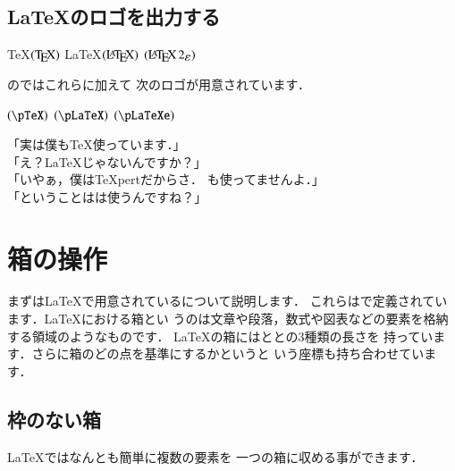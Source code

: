 \subsection{\LaTeX のロゴを出力する}
\begin{usage}
\TeX     $\text{(\TeX)}$
\LaTeX   $\text{(\LaTeX)}$
\LaTeXe  $\text{(\LaTeXe)}$
\end{usage}

のではこれらに加えて
次のロゴが用意されています．

\begin{usage}
\pTeX     $\text{(\pTeX)}$
\pLaTeX   $\text{(\pLaTeX)}$
\pLaTeXe  $\text{(\pLaTeXe)}$
\end{usage}

\begin{inout}
「実は僕も{\TeX}使っています．」\\
「え？{\LaTeX}じゃないんですか？」\\
「いやぁ，僕は{\TeX pert}だからさ．
 {\LaTeXe}も使ってませんよ．」\\
「ということは{\pTeX}は使うんですね？」
\end{inout}

\section{箱の操作}
まずは{\LaTeX}で用意されている{}について説明します．
これらはで定義されています．{\LaTeX}における箱とい
うのは文章や段落，数式や図表などの要素を格納する領域のようなものです．
{\LaTeX}の箱にはととの3種類の長さを
持っています．さらに箱のどの点を基準にするかというと
いう座標も持ち合わせています．

\subsection{枠のない箱}
{\LaTeX}ではなんとも簡単に複数の要素を
一つの箱に収める事ができます．
\begin{usage}
\end{usage}

